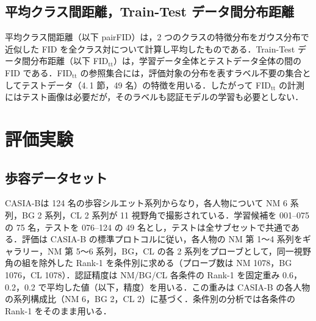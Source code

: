 \documentclass[technicalreport]{ieicej}
\begin{document}
\subsection{平均クラス間距離，Train-Test データ間分布距離}
平均クラス間距離（以下 pairFID）は，2 つのクラスの特徴分布をガウス分布で近似した FID\cite{Heusel_FID} を全クラス対について計算し平均したものである．Train-Test データ間分布距離（以下 FID$_{\mathrm{tt}}$）は，学習データ全体とテストデータ全体の間の FID である．FID$_{\mathrm{tt}}$ の参照集合には，評価対象の分布を表すラベル不要の集合としてテストデータ（4.\,1 節，49 名）の特徴を用いる．したがって FID$_{\mathrm{tt}}$ の計測にはテスト画像は必要だが，そのラベルも認証モデルの学習も必要としない．

\section{評価実験}


\subsection{歩容データセット}
CASIA-B\cite{Yu_CASIAB}は 124 名の歩容シルエット系列からなり，各人物について NM 6 系列，BG 2 系列，CL 2 系列が 11 視野角で撮影されている．学習候補を 001--075 の 75 名，テストを 076--124 の 49 名とし，テストは全サブセットで共通である．評価は CASIA-B の標準プロトコルに従い，各人物の NM 第 1〜4 系列をギャラリー，NM 第 5〜6 系列，BG，CL の各 2 系列をプローブとして，同一視野角の組を除外した Rank-1 を条件別に求める（プローブ数は NM 1078，BG 1076，CL 1078）．認証精度は NM/BG/CL 各条件の Rank-1 を固定重み 0.6，0.2，0.2 で平均した値（以下，精度）を用いる．この重みは CASIA-B の各人物の系列構成比（NM 6，BG 2，CL 2）に基づく．条件別の分析では各条件の Rank-1 をそのまま用いる．
\end{document}
